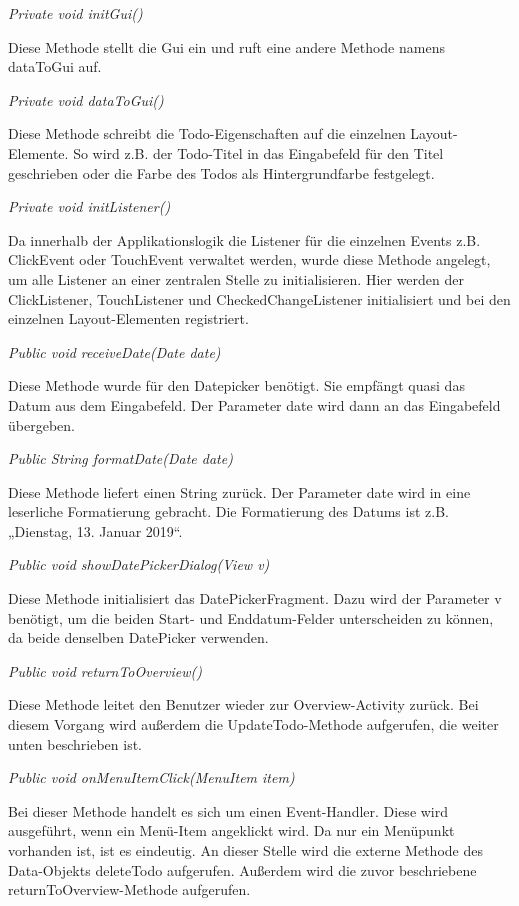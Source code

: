 \textit{Private void initGui()}

Diese Methode stellt die Gui ein und ruft eine andere Methode namens dataToGui auf.

\textit{Private void dataToGui()}

Diese Methode schreibt die Todo-Eigenschaften auf die einzelnen Layout-Elemente. So wird z.B. der Todo-Titel in das Eingabefeld für den Titel geschrieben oder die Farbe des Todos als Hintergrundfarbe festgelegt.

\textit{Private void initListener()}

Da innerhalb der Applikationslogik die Listener für die einzelnen Events z.B. ClickEvent oder TouchEvent verwaltet werden, wurde diese Methode angelegt, um alle Listener an einer zentralen Stelle zu initialisieren. Hier werden der ClickListener, TouchListener und CheckedChangeListener initialisiert und bei den einzelnen Layout-Elementen registriert.

\textit{Public void receiveDate(Date date)}

Diese Methode wurde für den Datepicker benötigt. Sie empfängt quasi das Datum aus dem Eingabefeld. Der Parameter date wird dann an das Eingabefeld übergeben.

\textit{Public String formatDate(Date date)}

Diese Methode liefert einen String zurück. Der Parameter date wird in eine leserliche Formatierung gebracht. Die Formatierung des Datums ist z.B. „Dienstag, 13. Januar 2019“.

\textit{Public void showDatePickerDialog(View v)}

Diese Methode initialisiert das DatePickerFragment. Dazu wird der Parameter v benötigt, um die beiden Start- und Enddatum-Felder unterscheiden zu können, da beide denselben DatePicker verwenden.

\textit{Public void returnToOverview()}

Diese Methode leitet den Benutzer wieder zur Overview-Activity zurück. Bei diesem Vorgang wird außerdem die UpdateTodo-Methode aufgerufen, die weiter unten beschrieben ist.

\textit{Public void onMenuItemClick(MenuItem item)}

Bei dieser Methode handelt es sich um einen Event-Handler. Diese wird ausgeführt, wenn ein Menü-Item angeklickt wird. Da nur ein Menüpunkt vorhanden ist, ist es eindeutig. An dieser Stelle wird die externe Methode des Data-Objekts deleteTodo aufgerufen. Außerdem wird die zuvor beschriebene returnToOverview-Methode aufgerufen.

